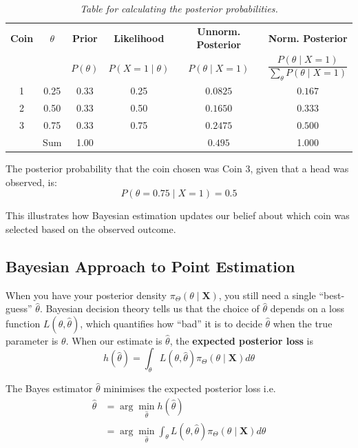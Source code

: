 \documentclass[twoside]{book}
\begin{document}
\begin{center}
\begin{table}[H]
\begin{tabular}{cc|cccc}
	\toprule
	\textbf{Coin} & $\theta$ & \textbf{Prior} & \textbf{Likelihood} & \textbf{Unnorm. Posterior} & \textbf{Norm. Posterior} \\
	&  & $P(\theta)$ & $P(X=1 \mid \theta)$ & $P(\theta \mid X = 1)$ & $\dfrac{P(\theta \mid X = 1)}{\sum_{\theta} P(\theta \mid X = 1)}$\\
	\midrule
	1 & 0.25 & 0.33 & 0.25 & $0.0825$ & $0.167$ \\
	2 & 0.50 & 0.33 & 0.50 & $0.1650$ & $0.333$ \\
	3 & 0.75 & 0.33 & 0.75 & $0.2475$ & $0.500$ \\
	\midrule
	&  Sum & 1.00 &  & $0.495$ & 1.000 \\
	\bottomrule
\end{tabular}
\caption{\textit{Table for calculating the posterior probabilities.}}
\end{table}
\end{center}

The posterior probability that the coin chosen was Coin 3, given that a head was observed, is:
\[
P(\theta = 0.75 \mid X = 1) = 0.5
\]

This illustrates how Bayesian estimation updates our belief about which coin was selected based on the observed outcome.

\subsection{Bayesian Approach to Point Estimation}

When you have your posterior density $\pi_{\Theta}(\theta\mid\mathbf{X})$, you still need a single “best‐guess” $\hat{\theta}$. Bayesian decision theory tells us that the choice of $\hat{\theta}$ depends on a loss function $L(\theta, \hat{\theta})$, which quantifies how “bad” it is to decide $\hat{\theta}$ when the true parameter is $\theta$. When our estimate is $\hat{\theta}$, the \textbf{expected posterior loss} is
$$h(\hat{\theta}) = \int_{\theta} L(\theta, \hat{\theta}) \pi_{\Theta}(\theta\mid\mathbf{X}) d\theta$$

The Bayes estimator $ \hat{\theta} $ minimises the expected posterior loss i.e.
\begin{align*}
\hat{\theta} &= \arg \min_{\hat{\theta}} h(\hat{\theta})\\ &= \arg \min_{\hat{\theta}} \int_{\theta} L(\theta, \hat{\theta}) \pi_{\Theta}(\theta\mid\mathbf{X}) d\theta
\end{align*}
\end{document}
